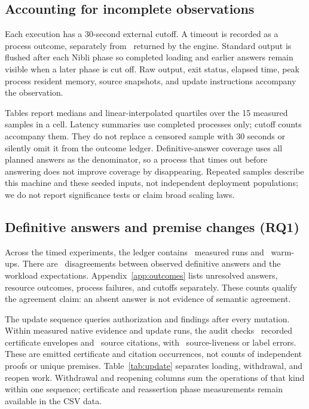 \subsection{Accounting for incomplete observations}

Each execution has a 30-second external cutoff. A timeout is recorded as a
process outcome, separately from \Resource\ returned by the engine.
Standard output is flushed after each Nibli phase so completed loading and
earlier answers remain visible when a later phase is cut off. Raw output,
exit status, elapsed time, peak process resident memory, source snapshots,
and update instructions accompany the observation.

Tables report medians and linear-interpolated quartiles over the 15 measured
samples in a cell. Latency summaries use completed processes only; cutoff
counts accompany them. They do not replace a censored sample with 30 seconds
or silently omit it from the outcome ledger. Definitive-answer coverage uses
all planned answers as the denominator, so a process that times out before
answering does not improve coverage by disappearing. Repeated samples describe
this machine and these seeded inputs, not independent deployment populations;
we do not report significance tests or claim broad scaling laws.

\subsection{Definitive answers and premise changes (RQ1)}

Across the timed experiments, the ledger contains \MeasuredRuns\ measured runs
and \WarmupRuns\ warm-ups. There are \DefinitiveMismatches\ disagreements between
observed definitive answers and the workload expectations.
Appendix~\ref{app:outcomes} lists unresolved answers, resource outcomes,
process failures, and cutoffs separately. These counts qualify the agreement
claim: an absent answer is not evidence of semantic agreement.

The update sequence queries authorization and findings after every mutation.
Within measured native evidence and update runs, the audit checks
\CertificateCount\ recorded certificate envelopes and
\CitationCount\ source citations, with \CitationErrors\ source-liveness or label
errors. These are emitted certificate and citation occurrences, not counts of
independent proofs or unique premises. Table~\ref{tab:update} separates loading,
withdrawal, and reopen work. Withdrawal and reopening columns sum the operations
of that kind within one sequence; certificate and reassertion phase measurements
remain available in the CSV data.

